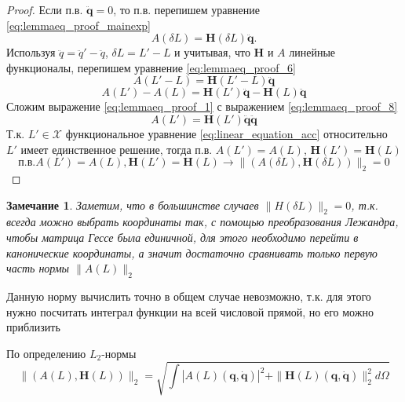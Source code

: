 \documentclass[a4paper, 12pt]{article}
\newtheorem{remark}{Замечание}
\begin{document}
\begin{proof}
Если п.в. $\ddot{\mathbf{q}} = 0$, то п.в. перепишем уравнение \ref{eq:lemmaeq_proof_mainexp} 
\begin{equation}
\label{eq:lemmaeq_proof_6}
A(\delta L) = \mathbf{H}(\delta L)\ddot{\mathbf{q}}.
\end{equation}
Используя $\ddot{q} = \ddot{q}' - \ddot{q}$, $\delta L = L' - L$ и учитывая, что $\mathbf{H}$ и $A$ линейные функционалы, перепишем уравнение \ref{eq:lemmaeq_proof_6}
\begin{equation}
\label{eq:lemmaeq_proof_7}
A(L' - L) = \mathbf{H}(L' - L)\ddot{\mathbf{q}}
\end{equation}
\begin{equation}
\label{eq:lemmaeq_proof_8}
A(L') - A(L) = \mathbf{H}(L')\ddot{\mathbf{q}} -\mathbf{H}(L)\ddot{\mathbf{q}}
\end{equation}
Сложим выражение \ref{eq:lemmaeq_proof_1} с выражением
\ref{eq:lemmaeq_proof_8}
\begin{equation}
\label{eq:lemmaeq_proof_9}
A(L') = \mathbf{H}(L')\ddot{\mathbf{q}}\ddot{\mathbf{q}}
\end{equation}
Т.к. $L' \in \mathcal{X}$ функциональное уравнение \ref{eq:linear_equation_acc} относительно $L'$ имеет единственное решение, тогда п.в. $A(L') = A(L)$, $\mathbf{H}(L') = \mathbf{H}(L)$
\begin{equation}
\label{eq:lemmaeq_proof_9}
\text{п.в.} A(L') = A(L), \mathbf{H}(L') = \mathbf{H}(L) \rightarrow \|(A(\delta L), \mathbf{H}(\delta L))\|_2 = 0
\end{equation}

\end{proof}

\begin{remark} \label{remark3}
Заметим, что в большинстве случаев  $\|H(\delta L)\|_2 = 0$, т.к. всегда можно выбрать координаты так, с помощью преобразования Лежандра, чтобы матрица Гессе была единичной, для этого необходимо перейти в канонические координаты, а значит достаточно сравнивать только первую часть нормы $\|A(L)\|_2$
\end{remark}

Данную норму вычислить точно в общем случае невозможно, т.к. для этого нужно посчитать интеграл функции на всей числовой прямой, но его можно приблизить

По определению $L_2$-нормы
\begin{equation}
\label{eq:l2_norm_approx_1}
\|(A(L), \mathbf{H}(L))\|_2 = \sqrt{\int |A(L)\left(\mathbf{q}, \dot{\mathbf{q}}\right)|^2 + \|\mathbf{H}(L)\left(\mathbf{q}, \dot{\mathbf{q}}\right)\|_2^2  d\Omega} 
\end{equation}
\end{document}
